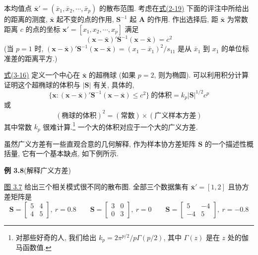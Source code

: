 本均值点 $\bar{\mathbf{x}}'=(\bar{x}_{1},\bar{x}_{2},\cdots,\bar{x}_{p})$ 的散布范围. 考虑在\hyperref[eq:2-19]{式(2-19)} 下面的评注中所给出的距离的测度, $\bar{\mathbf{x}}$ 起不变的点的作用, $\mathbf{S}^{-1}$ 起 $\mathbf{A}$ 的作用. 作出选择后, 距 $\bar{\mathbf{x}}$ 为常数距离 $c$ 的点的坐标 $\mathbf{x}'=[x_{1},x_{2},\cdots,x_{p}]$ 满足
\label{eq:3-16}
\begin{equation}
(\mathbf{x}-\bar{\mathbf{x}})'\mathbf{S}^{-1}(\mathbf{x}-\bar{\mathbf{x}})=c^{2}
\tag{3-16}
\end{equation}
(当 $p=1$ 时, $(\mathbf{x}-\bar{\mathbf{x}})'\mathbf{S}^{-1}(\mathbf{x}-\bar{\mathbf{x}})=(x_{1}-\bar{x}_{1})^{2}/s_{11}$ 是从 $\bar{x}_{1}$ 到 $x_{1}$ 的单位标准差的距离平方.)

\hyperref[eq:3-16]{式(3-16)} 定义一个中心在 $\bar{\mathbf{x}}$ 的超椭球 (如果 $p=2$, 则为椭圆). 可以利用积分计算证明这个超椭球的体积与 $|\mathbf{S}|$ 有关, 具体的,
\label{eq:3-17}
\begin{equation}
\{\mathbf{x}:(\mathbf{x}-\bar{\mathbf{x}})'\mathbf{S}^{-1}(\mathbf{x}-\bar{\mathbf{x}})\le c^{2}\}\ \text{的体积}=k_{p}|\mathbf{S}|^{1/2}c^{p}
\tag{3-17}
\end{equation}
或
\[
(\text{椭球的体积})^{2}=(\text{常数})\times(\text{广义样本方差})
\]
其中常数 $k_{p}$ 很难计算.\footnote{{\footnotesize 对那些好奇的人, 我们给出 $k_{p}=2\pi^{p/2}/p\Gamma(p/2)$, 其中 $\Gamma(z)$ 是在 $z$ 处的伽马函数值.}} 一个大的体积对应于一个大的广义方差.

虽然广义方差有一些直观合意的几何解释, 作为样本协方差矩阵 $\mathbf{S}$ 的一个描述性概括量, 它有一个基本缺点, 如下例所示.

\medskip
\noindent\textbf{例 3.8}\quad (解释广义方差)

\hyperref[fig:3.7]{图 3.7} 给出三个相关模式很不同的散布图. 全部三个数据集有 $\bar{\mathbf{x}}'=[1,2]$ 且协方差矩阵是
\[
\mathbf{S}=\begin{bmatrix}5&4\\4&5\end{bmatrix},\ r=0.8\qquad
\mathbf{S}=\begin{bmatrix}3&0\\0&3\end{bmatrix},\ r=0\qquad
\mathbf{S}=\begin{bmatrix}5&-4\\-4&5\end{bmatrix},\ r=-0.8
\]

\begin{mvfigure}
\label{fig:3.7}
\end{mvfigure}

